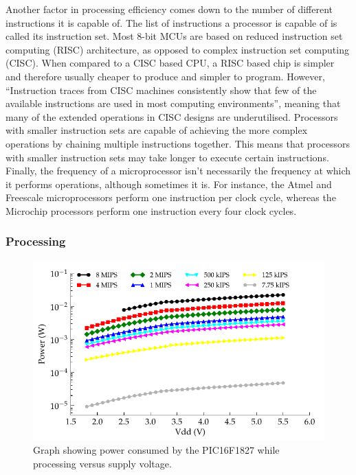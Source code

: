       Another factor in processing efficiency comes down to the number of different instructions it is capable of.
      The list of instructions a processor is capable of is called its instruction set.
      Most 8-bit MCUs are based on reduced instruction set computing (RISC) architecture, as opposed to complex instruction set computing (CISC).
      When compared to a CISC based CPU, a RISC based chip is simpler and therefore usually cheaper to produce and simpler to program.
      However, ``Instruction traces from CISC machines consistently show that few of the available instructions are used in most computing environments''\cite{ComputerArch}, meaning that many of the extended operations in CISC designs are underutilised.
      Processors with smaller instruction sets are capable of achieving the more complex operations by chaining multiple instructions together.
      This means that processors with smaller instruction sets may take longer to execute certain instructions.
      Finally, the frequency of a microprocessor isn't necessarily the frequency at which it performs operations, although sometimes it is.
      For instance, the Atmel and Freescale microprocessors perform one instruction per clock cycle, whereas the Microchip processors perform one instruction every four clock cycles.


    \subsubsection{Processing}

      \begin{figure}
        \centering
        \includegraphics{content/pt1/03-EnergyRequirements/graphics/Graph_PIC16F1827_Clock_Power}
        \caption{\label{graph:CLK_POWER_16F1827}Graph showing power consumed by the PIC16F1827 while processing versus supply voltage.}
      \end{figure}

